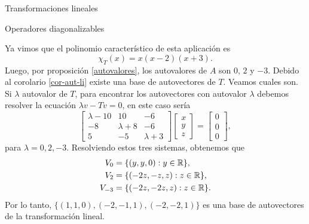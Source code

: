 \begin{chapter}{Transformaciones lineales}
\begin{section}{Operadores diagonalizables}
\begin{ejemplo*}
        Ya vimos que  el  polinomio característico de esta aplicación es 
        $$
        \chi_T(x) = x (x-2)(x+3).
        $$
        Luego, por 	proposición \ref{autovalores}, los autovalores de $A$ son $0$, $2$ y $-3$. Debido al corolario \ref{cor-aut-li} existe una base de autovectores de $T$. Veamos cuales son. Si $\lambda$ autovalor de $T$, para encontrar los autovectores con autovalor $\lambda$  debemos resolver la ecuación $\lambda v-Tv=0 $,  en este caso sería
        \begin{equation*}
        \begin{bmatrix}\lambda-10 &10&-6\\-8&  \lambda +8& -6\\5& -5& \lambda +3  \end{bmatrix}
        \begin{bmatrix} x\\y\\z \end{bmatrix} =
        \begin{bmatrix} 0\\0 \\0\end{bmatrix},
        \end{equation*}  
        para $\lambda =0, 2,-3$. Resolviendo estos tres sistemas, obtenemos que 
        \begin{align*}
            V_0&= \{(y,y,0): y \in \mathbb R \},\\ 
            V_2 &= \{(-2z,-z,z): z \in \mathbb R \},\\ 
            V_{-3} &= \{(-2z,-2z,z): z \in \mathbb R \}. 
        \end{align*}
        Por lo tanto, $\{(1,1,0), (-2,-1,1), (-2,-2,1)\}$ es una base de autovectores de la transformación lineal. 
        \end{ejemplo*}
        

\end{section}
\end{chapter}
